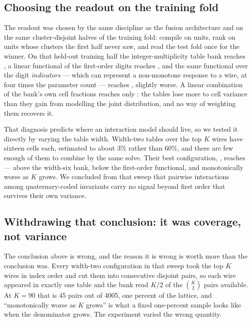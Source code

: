 \documentclass[11pt]{article}
\begin{document}
\subsection{Choosing the readout on the training fold}
\label{sec:readout}
The readout was chosen by the same discipline as the fusion architecture and on
the same cluster-disjoint halves of the training fold: compile on
\NSelectFitUnits{} units, rank on \NSelectPickUnits{} units whose clusters the
first half never saw, and read the test fold once for the winner. On that
held-out training half the integer-multiplicity table bank reaches \PickCount{},
a linear functional of the \NLinWires{} first-order digits reaches
\PickLinDigits{}, and the same functional over the digit \emph{indicators} ---
which can represent a non-monotone response to a wire, at four times the
parameter count --- reaches \PickLinOnehot{}, slightly worse. A linear
combination of the bank's own cell fractions reaches only \PickLinTables{}: the
tables lose more to cell variance than they gain from modelling the joint
distribution, and no way of weighting them recovers it.

That diagnosis predicts where an interaction model should live, so we tested it
directly by varying the table width. Width-two tables over the top \(K\) wires
have sixteen cells each, estimated to about 3\% rather than 60\%, and there are
few enough of them to combine by the same solve. Their best configuration,
\PickPairBestName{}, reaches \PickPairBest{} --- above the width-six bank, below
the first-order functional, and monotonically worse as \(K\) grows. We concluded
from that sweep that pairwise interactions among quaternary-coded invariants
carry no signal beyond first order that survives their own variance.

\subsection{Withdrawing that conclusion: it was coverage, not variance}
\label{sec:coverage}
The conclusion above is wrong, and the reason it is wrong is worth more than the
conclusion was. Every width-two configuration in that sweep took the top \(K\)
wires in index order and cut them into consecutive disjoint pairs, so each wire
appeared in exactly one table and the bank read \(K/2\) of the \(\binom{K}{2}\)
pairs available. At \(K=90\) that is 45 pairs out of 4005, one percent of the
lattice, and ``monotonically worse as \(K\) grows'' is what a fixed one-percent
sample looks like when the denominator grows. The experiment varied the wrong
quantity.
\end{document}
